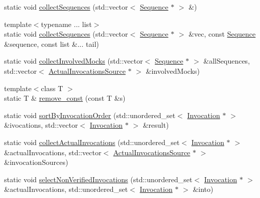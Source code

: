 \begin{DoxyCompactItemize}
\item 
static void \mbox{\hyperlink{structfakeit_1_1InvocationUtils_ac2d11afbe797cdd0978cf42a25c4c1a6}{collect\+Sequences}} (std\+::vector$<$ \mbox{\hyperlink{classfakeit_1_1Sequence}{Sequence}} $\ast$ $>$ \&)
\item 
{\footnotesize template$<$typename ... list$>$ }\\static void \mbox{\hyperlink{structfakeit_1_1InvocationUtils_a43b674a2f1109acf4c870e8fb9c2571d}{collect\+Sequences}} (std\+::vector$<$ \mbox{\hyperlink{classfakeit_1_1Sequence}{Sequence}} $\ast$ $>$ \&vec, const \mbox{\hyperlink{classfakeit_1_1Sequence}{Sequence}} \&sequence, const list \&... tail)
\item 
static void \mbox{\hyperlink{structfakeit_1_1InvocationUtils_a8a2610f9bc4c88cb2705221970bb93d6}{collect\+Involved\+Mocks}} (std\+::vector$<$ \mbox{\hyperlink{classfakeit_1_1Sequence}{Sequence}} $\ast$ $>$ \&all\+Sequences, std\+::vector$<$ \mbox{\hyperlink{structfakeit_1_1ActualInvocationsSource}{Actual\+Invocations\+Source}} $\ast$ $>$ \&involved\+Mocks)
\item 
{\footnotesize template$<$class T $>$ }\\static T \& \mbox{\hyperlink{structfakeit_1_1InvocationUtils_ad92724e2654997a1db229644d7f2ada9}{remove\+\_\+const}} (const T \&s)
\item 
static void \mbox{\hyperlink{structfakeit_1_1InvocationUtils_a0badf7e54dd25b44d90b174d6ac39fa3}{sort\+By\+Invocation\+Order}} (std\+::unordered\+\_\+set$<$ \mbox{\hyperlink{structfakeit_1_1Invocation}{Invocation}} $\ast$ $>$ \&ivocations, std\+::vector$<$ \mbox{\hyperlink{structfakeit_1_1Invocation}{Invocation}} $\ast$ $>$ \&result)
\item 
static void \mbox{\hyperlink{structfakeit_1_1InvocationUtils_a0bb553d912e1d41f5fc1cf2d16ae9e55}{collect\+Actual\+Invocations}} (std\+::unordered\+\_\+set$<$ \mbox{\hyperlink{structfakeit_1_1Invocation}{Invocation}} $\ast$ $>$ \&actual\+Invocations, std\+::vector$<$ \mbox{\hyperlink{structfakeit_1_1ActualInvocationsSource}{Actual\+Invocations\+Source}} $\ast$ $>$ \&invocation\+Sources)
\item 
static void \mbox{\hyperlink{structfakeit_1_1InvocationUtils_a333ea33ae42d98d58c0cf5cbb9a1d3cb}{select\+Non\+Verified\+Invocations}} (std\+::unordered\+\_\+set$<$ \mbox{\hyperlink{structfakeit_1_1Invocation}{Invocation}} $\ast$ $>$ \&actual\+Invocations, std\+::unordered\+\_\+set$<$ \mbox{\hyperlink{structfakeit_1_1Invocation}{Invocation}} $\ast$ $>$ \&into)
\item 

\end{DoxyCompactItemize}
